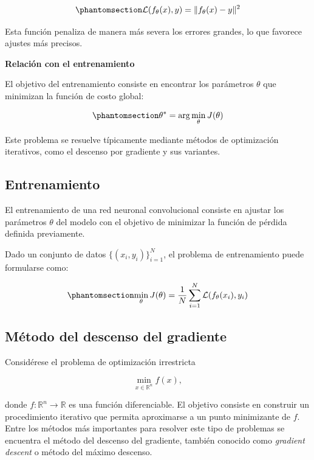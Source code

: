 \documentclass[
  spanish,
  us-letterpaper,
  DIV=11,
  numbers=noendperiod]{scrreprt}
\begin{document}
\begin{equation}\phantomsection\label{eq-mse}{
\mathcal{L}(f_\theta(x), y) = \| f_\theta(x) - y \|^2
}\end{equation}

Esta función penaliza de manera más severa los errores grandes, lo que
favorece ajustes más precisos.

\textbf{Relación con el entrenamiento}

El objetivo del entrenamiento consiste en encontrar los parámetros
\(\theta\) que minimizan la función de costo global:

\begin{equation}\phantomsection\label{eq-opt}{
\theta^* = \arg\min_{\theta} J(\theta)
}\end{equation}

Este problema se resuelve típicamente mediante métodos de optimización
iterativos, como el descenso por gradiente y sus variantes.

\subsection{Entrenamiento}\label{entrenamiento}

El entrenamiento de una red neuronal convolucional consiste en ajustar
los parámetros \(\theta\) del modelo con el objetivo de minimizar la
función de pérdida definida previamente.

Dado un conjunto de datos \(\{(x_i, y_i)\}_{i=1}^{N}\), el problema de
entrenamiento puede formularse como:

\begin{equation}\phantomsection\label{eq-entrenamiento}{
\min_{\theta} J(\theta) = \frac{1}{N} \sum_{i=1}^{N} \mathcal{L}(f_\theta(x_i), y_i)
}\end{equation}

\subsection{Método del descenso del
gradiente}\label{muxe9todo-del-descenso-del-gradiente}

Considérese el problema de optimización irrestricta

\[
\min_{x \in \mathbb{R}^n} f(x),
\]

donde \(f:\mathbb{R}^n \to \mathbb{R}\) es una función diferenciable. El
objetivo consiste en construir un procedimiento iterativo que permita
aproximarse a un punto minimizante de \(f\). Entre los métodos más
importantes para resolver este tipo de problemas se encuentra el método
del descenso del gradiente, también conocido como \emph{gradient
descent} o método del máximo descenso.
\end{document}
